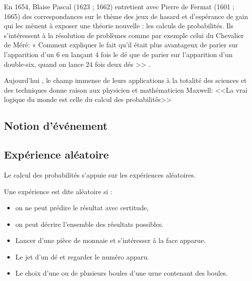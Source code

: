 
\everymath{\displaystyle}



En 1654,  Blaise Pascal (1623 ; 1662) entretient avec Pierre de Fermat (1601 ; 1665) des correspondances sur le thème des jeux de hasard et d'espérance de gain qui les mènent à exposer une théorie nouvelle : les calculs de probabilités. Ils s’intéressent à la résolution de problèmes comme par exemple celui du Chevalier de Méré: « Comment expliquer le fait qu'il était  plus avantageux de parier sur l'apparition d'un 6 en lançant 4 fois le dé  que de parier sur l'apparition d'un double-six, quand on lance 24 fois deux dés >> .


Aujourd'hui , le champ immense  de leurs applications à la totalité des sciences et des techniques donne raison aux physicien et mathématicien Maxwell: <<La vrai logique du monde est celle  du calcul des probabilités>>


\subsection{Notion d'événement}
\subsection*{Expérience aléatoire}
Le calcul des probabilités s’appuie sur les expériences aléatoires.




\begin{definition}
 Une expérience est dite aléatoire si :
 \begin{itemize}
 \item  on ne peut prédire le résultat avec certitude,
 \item on peut décrire l’ensemble des résultats possibles.
 \end{itemize}
  \end{definition}
\begin{example}
\begin{itemize}
\item Lancer d’une pièce de monnaie et s'intéresser à la face apparue. 
\item Le jet d’un dé et regarder le  numéro apparu. 
\item Le choix d’une ou de plusieurs boules d’une urne contenant des boules. 
\end{itemize}
\end{example}

